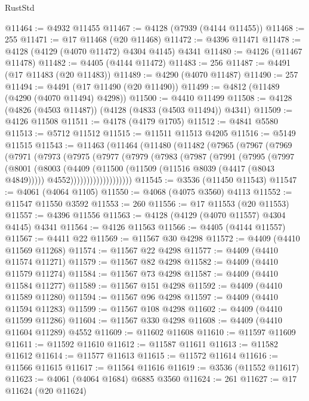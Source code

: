 \begin{lexlean}{RustStd}
\begin{coremodule}
@11464 := @4932 @11455
@11467 := @4128 (@7939 (@4144 @11455))
@11468 := 255
@11471 := @17 @11468 (@20 @11468)
@11472 := @4396 @11471
@11478 := @4128 (@4129 (@4070 @11472) @4304 @4145) @4341
@11480 := @4126 (@11467 @11478)
@11482 := @4405 (@4144 @11472)
@11483 := 256
@11487 := @4491 (@17 @11483 (@20 @11483))
@11489 := @4290 (@4070 @11487)
@11490 := 257
@11494 := @4491 (@17 @11490 (@20 @11490))
@11499 := @4812 (@11489 (@4290 (@4070 @11494) @4298))
@11500 := @4410 @11499
@11508 := @4128 (@4826 (@4503 @11487)) (@4128 (@4833 (@4503 @11494)) @4341)
@11509 := @4126 @11508
@11511 := @4178 (@4179 @1705)
@11512 := @4841 @5580
@11513 := @5712 @11512
@11515 := @11511 @11513 @4205
@11516 := @5149 @11515
@11543 := @11463
    (@11464
      (@11480
        (@11482
          (@7965
            (@7967
              (@7969
                (@7971
                  (@7973
                    (@7975
                      (@7977
                        (@7979
                          (@7983
                            (@7987
                              (@7991
                                (@7995
                                  (@7997
                                    (@8001
                                      (@8003
                                        (@4409
                                          (@11500 (@11509 (@11516 @8039 (@4417 (@8043 @4849)))))
                                          @4552)))))))))))))))))))
@11545 := @3536 (@11450 @11543)
@11547 := @4061 (@4064 @1105)
@11550 := @4068 (@4075 @3560) @4113
@11552 := @11547 @11550 @3592
@11553 := 260
@11556 := @17 @11553 (@20 @11553)
@11557 := @4396 @11556
@11563 := @4128 (@4129 (@4070 @11557) @4304 @4145) @4341
@11564 := @4126 @11563
@11566 := @4405 (@4144 @11557)
@11567 := @4411 @22
@11569 := @11567 @30 @4298
@11572 := @4409 (@4410 @11569 @11268)
@11574 := @11567 @22 @4298
@11577 := @4409 (@4410 @11574 @11271)
@11579 := @11567 @82 @4298
@11582 := @4409 (@4410 @11579 @11274)
@11584 := @11567 @73 @4298
@11587 := @4409 (@4410 @11584 @11277)
@11589 := @11567 @151 @4298
@11592 := @4409 (@4410 @11589 @11280)
@11594 := @11567 @96 @4298
@11597 := @4409 (@4410 @11594 @11283)
@11599 := @11567 @108 @4298
@11602 := @4409 (@4410 @11599 @11286)
@11604 := @11567 @330 @4298
@11608 := @4409 (@4410 @11604 @11289) @4552
@11609 := @11602 @11608
@11610 := @11597 @11609
@11611 := @11592 @11610
@11612 := @11587 @11611
@11613 := @11582 @11612
@11614 := @11577 @11613
@11615 := @11572 @11614
@11616 := @11566 @11615
@11617 := @11564 @11616
@11619 := @3536 (@11552 @11617)
@11623 := @4061 (@4064 @1684) @6885 @3560
@11624 := 261
@11627 := @17 @11624 (@20 @11624)

\end{coremodule}
\end{lexlean}
